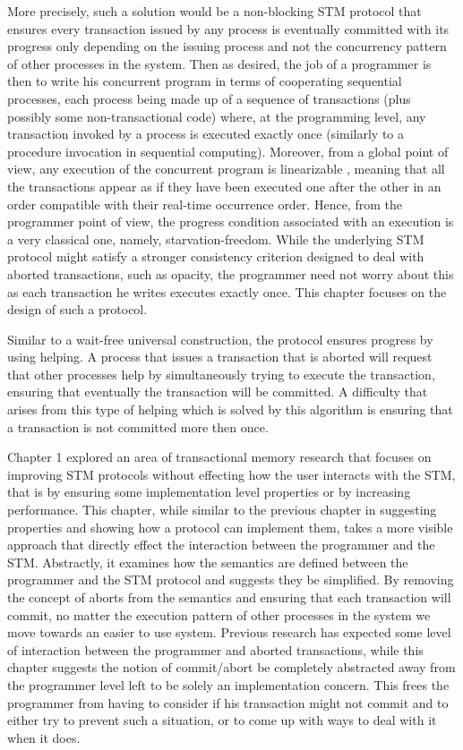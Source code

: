 More precisely, such a solution would be a non-blocking STM protocol that ensures every transaction
issued by any process is eventually committed with its progress only depending
on the issuing process and not the concurrency pattern of other processes in the system.
Then as desired, the job of a
programmer is then to write his concurrent program in terms of cooperating sequential
processes, each process being made up of a sequence of transactions (plus possibly
some non-transactional code) where,
at the programming level, any transaction invoked by
a process is executed exactly once (similarly to a procedure invocation in sequential
computing).
Moreover, from a global point of view, any execution of the concurrent
program is linearizable \cite{HW90}, meaning that all the transactions appear as if they have
been executed one after the other in an order compatible with their real-time occurrence
order. Hence, from the programmer point of view, the progress condition associated
with an execution is a very classical one, namely, starvation-freedom.
While the underlying STM protocol might satisfy a stronger consistency criterion
designed to deal with aborted transactions,
such as opacity, the programmer need not worry about this as each transaction
he writes executes exactly once.
This chapter focuses on the design of such a protocol.



Similar to a wait-free universal construction, the protocol ensures progress
by using helping.
A process that issues a transaction that is aborted will request 
that other processes help by simultaneously trying to execute the transaction,
ensuring that eventually the transaction will be committed.
A difficulty that arises from this type of helping 
which is solved by this algorithm
is ensuring that a transaction is not committed more then once.


Chapter 1 explored an area of transactional memory
research that focuses on improving STM protocols without effecting
how the user interacts with the STM, that is by ensuring some implementation
level properties or by increasing performance.
This chapter, while similar to the previous chapter in suggesting properties
and showing how a protocol can implement them,
takes a more visible approach
that directly effect the interaction between the programmer and
the STM.
Abstractly, it examines how the semantics are defined between
the programmer and the STM protocol and suggests they be simplified.
By removing the concept of aborts from the semantics and
ensuring that each transaction will commit, no matter the 
execution pattern of other processes in the system
we move towards an easier to use system.
Previous research has expected some level of interaction
between the programmer and aborted transactions, while this
chapter suggests the notion of commit/abort be completely abstracted
away from the programmer level left to be solely an implementation
concern.
This frees the programmer from having to consider if his transaction
might not commit and to either try to prevent such a situation, or to 
come up with ways to deal with it when it does.

